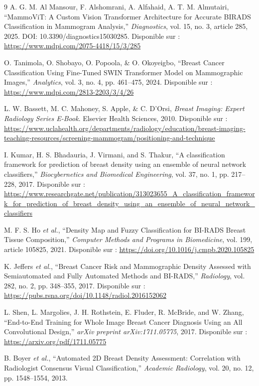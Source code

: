 \documentclass[12pt,a4paper]{report}
\begin{document}
\begin{thebibliography}{9}
A. G. M. Al Mansour, F. Alshomrani, A. Alfahaid, A. T. M. Almutairi,
``MammoViT: A Custom Vision Transformer Architecture for Accurate BIRADS Classification in Mammogram Analysis,''
\textit{Diagnostics}, vol. 15, no. 3, article 285, 2025.
DOI: 10.3390/diagnostics15030285.
Disponible sur : \url{https://www.mdpi.com/2075-4418/15/3/285}

O. Tanimola, O. Shobayo, O. Popoola, \& O. Okoyeigbo,
``Breast Cancer Classification Using Fine-Tuned SWIN Transformer Model on Mammographic Images,''
\textit{Analytics}, vol. 3, no. 4, pp. 461--475, 2024.
Disponible sur : \url{https://www.mdpi.com/2813-2203/3/4/26}

L. W. Bassett, M. C. Mahoney, S. Apple, \& C. D'Orsi,
\textit{Breast Imaging: Expert Radiology Series E-Book}.
Elsevier Health Sciences, 2010.
Disponible sur : \url{https://www.uclahealth.org/departments/radiology/education/breast-imaging-teaching-resources/screening-mammogram/positioning-and-technique}

I. Kumar, H. S. Bhadauria, J. Virmani, and S. Thakur,
``A classification framework for prediction of breast density using an ensemble of neural network classifiers,''
\textit{Biocybernetics and Biomedical Engineering}, vol. 37, no. 1, pp. 217--228, 2017.
Disponible sur : \url{https://www.researchgate.net/publication/313023655_A_classification_framework_for_prediction_of_breast_density_using_an_ensemble_of_neural_network_classifiers}

M. F. S. Ho \textit{et al.},
``Density Map and Fuzzy Classification for BI-RADS Breast Tissue Composition,''
\textit{Computer Methods and Programs in Biomedicine}, vol. 199, article 105825, 2021.
Disponible sur : \url{https://doi.org/10.1016/j.cmpb.2020.105825}

K. Jeffers \textit{et al.},
``Breast Cancer Risk and Mammographic Density Assessed with Semiautomated and Fully Automated Methods and BI-RADS,''
\textit{Radiology}, vol. 282, no. 2, pp. 348--355, 2017.
Disponible sur : \url{https://pubs.rsna.org/doi/10.1148/radiol.2016152062}

L. Shen, L. Margolies, J. H. Rothstein, E. Fluder, R. McBride, and W. Zhang,
``End-to-End Training for Whole Image Breast Cancer Diagnosis Using an All Convolutional Design,''
\textit{arXiv preprint arXiv:1711.05775}, 2017.
Disponible sur : \url{https://arxiv.org/pdf/1711.05775}

B. Boyer \textit{et al.},
``Automated 2D Breast Density Assessment: Correlation with Radiologist Consensus Visual Classification,''
\textit{Academic Radiology}, vol. 20, no. 12, pp. 1548--1554, 2013.


\end{thebibliography}
\end{document}
